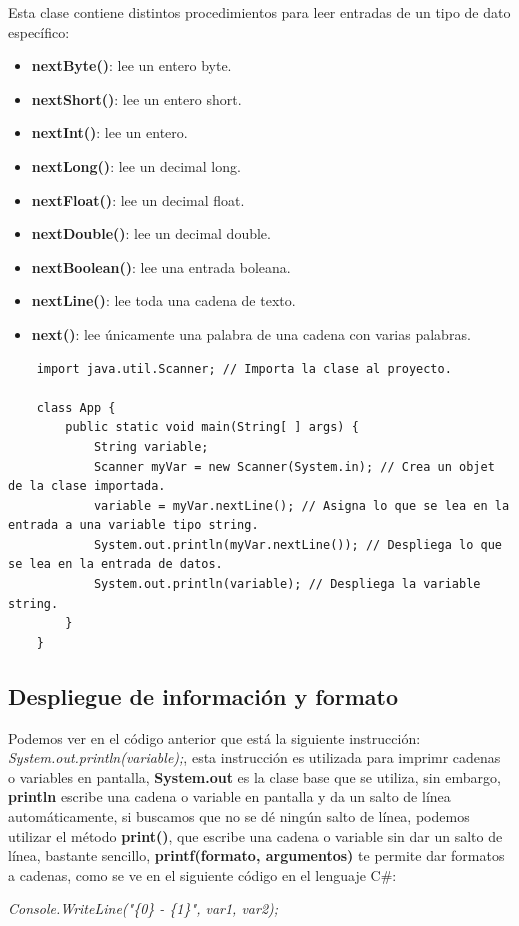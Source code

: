 Esta clase contiene distintos procedimientos para leer entradas de un tipo de dato específico:
\begin{itemize}
    \item \textbf{nextByte()}: lee un entero byte.
    \item \textbf{nextShort()}: lee un entero short.
    \item \textbf{nextInt()}: lee un entero.
    \item \textbf{nextLong()}: lee un decimal long.
    \item \textbf{nextFloat()}: lee un decimal float.
    \item \textbf{nextDouble()}: lee un decimal double.
    \item \textbf{nextBoolean()}: lee una entrada boleana.
    \item \textbf{nextLine()}: lee toda una cadena de texto.
    \item \textbf{next()}: lee únicamente una palabra de una cadena con varias palabras.
\end{itemize}
\begin{lstlisting}
    import java.util.Scanner; // Importa la clase al proyecto.

    class App {
        public static void main(String[ ] args) {
            String variable;
            Scanner myVar = new Scanner(System.in); // Crea un objet de la clase importada.
            variable = myVar.nextLine(); // Asigna lo que se lea en la entrada a una variable tipo string.
            System.out.println(myVar.nextLine()); // Despliega lo que se lea en la entrada de datos.
            System.out.println(variable); // Despliega la variable string.
        }
    }
\end{lstlisting}


\subsection{Despliegue de información y formato}
\hspace{0.55cm}Podemos ver en el código anterior que está la siguiente instrucción: \textit{System.out.println(variable);}, esta instrucción es utilizada para imprimr cadenas o variables en pantalla, \textbf{System.out} es la clase base que se utiliza, sin embargo, \textbf{println} escribe una cadena o variable en pantalla y da un salto de línea automáticamente, si buscamos que no se dé ningún salto de línea, podemos utilizar el método \textbf{print()}, que escribe una cadena o variable sin dar un salto de línea, bastante sencillo, \textbf{printf(formato, argumentos)} te permite dar formatos a cadenas, como se ve en el siguiente código en el lenguaje C\#:
\begin{center}
	\textit{Console.WriteLine("\{0\} - \{1\}", var1, var2);}
\end{center}

